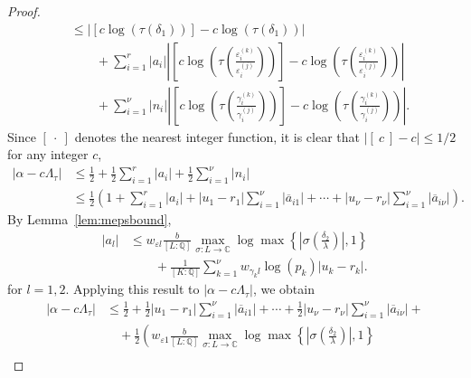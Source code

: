 \begin{proof}
\begin{align*}
	& \leq \left| [c\log(\tau(\delta_1))] - c\log\left(\tau\left(\delta_1\right)\right)\right| \\
	& \quad \quad  + \sum_{i = 1}^r |a_i|\left| \left[c\log\left(\tau\left(\frac{\varepsilon_i^{(k)}}{\varepsilon_i^{(j)}}\right)\right)\right] - c\log\left(\tau\left( \frac{\varepsilon_i^{(k)}}{\varepsilon_i^{(j)}}\right) \right)\right|\\
	& \quad \quad +  \sum_{i = 1}^{\nu} |n_i|\left| \left[c\log\left(\tau\left(\frac{\gamma_i^{(k)}}{\gamma_i^{(j)}}\right)\right)\right] - c\log \left(\tau\left( \frac{\gamma_i^{(k)}}{\gamma_i^{(j)}}\right)\right)\right|.
\end{align*}
Since $[ \ \cdot \ ]$ denotes the nearest integer function, it is clear that $|[ \ c \ ] - c| \leq 1/2$ for any integer $c$, 
\begin{align*}
|\alpha-c\Lambda_\tau|
	& \leq \frac{1}{2} + \frac{1}{2}\sum_{i = 1}^r |a_i| + \frac{1}{2}\sum_{i = 1}^{\nu} |n_i|\\
	& \leq \frac{1}{2}\left(1 + \sum_{i = 1}^r |a_i| + |u_1-r_1|\sum_{i=1}^{\nu}|\overline{a}_{i1}| + \cdots + |u_{\nu} - r_{\nu}| \sum_{i=1}^{\nu}|\overline{a}_{i\nu}|\right).
\end{align*}
By Lemma~\ref{lem:mepsbound}, 
\begin{align*}
|a_l| & \leq  w_{\varepsilon l} \frac{b}{[L:\mathbb{Q}]} \max_{\sigma :L \to \mathbb{C}} \log \max \left\{ \left|\sigma\left(\frac{\delta_2}{\lambda}\right)\right|, 1\right\} \\
	& \quad \quad+ \frac{1}{[K:\mathbb{Q}]}\sum_{k = 1}^{\nu} w_{\gamma_k l}\log(p_k)|u_k - r_k|.
\end{align*}
for $l = 1,2$. Applying this result to $|\alpha-c\Lambda_\tau|$, we obtain
\begin{align*}
|\alpha-c\Lambda_\tau| 
	& \leq \frac{1}{2} + \frac{1}{2}|u_1-r_1|\sum_{i=1}^{\nu}|\overline{a}_{i1}| + \cdots + \frac{1}{2}|u_{\nu} - r_{\nu}| \sum_{i=1}^{\nu}|\overline{a}_{i\nu}| + \\
	& \quad + \frac{1}{2}\left(w_{\varepsilon 1} \frac{b}{[L:\mathbb{Q}]} \max_{\sigma :L \to \mathbb{C}} \log \max \left\{ \left|\sigma\left(\frac{\delta_2}{\lambda}\right)\right|, 1\right\}\right. \\

\end{align*}
\end{proof}
